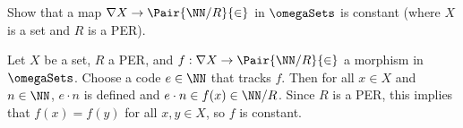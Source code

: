\begin{exercise}
Show that a map \(\nabla X \to \Pair{\NN / R}{\in}\) in \(\omegaSets\) is constant (where \(X\) is a set and \(R\) is a PER).
\end{exercise}

\begin{solution}
Let \(X\) be a set, \(R\) a PER, and \(f : \nabla X \to \Pair{\NN / R}{\in}\) a morphism in \(\omegaSets\).
Choose a code \(e \in \NN\) that tracks \(f\).
Then for all \(x \in X\) and \(n \in \NN\), \(e \cdot n\) is defined and \(e \cdot n \in f(x) \in \NN / R\). Since \(R\) is a PER, this implies that \(f(x) = f(y)\) for all \(x, y \in X\), so \(f\) is constant.
\end{solution}